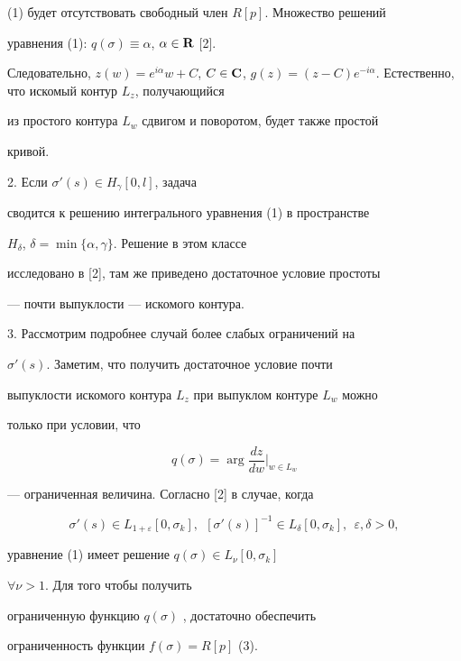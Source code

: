 (1) будет отсутствовать свободный член $R[p]$. Множество решений


уравнения (1): $q(\sigma) \equiv \alpha$, $\alpha \in {\bold R}$ [2].


Следовательно, $z(w) = e^{i\alpha} w + C$, $C \in {\bold C}$, $g(z) = (z -


C) e^{- i\alpha}$. Естественно, что искомый контур $L_z$, получающийся


из простого контура $L_w$ сдвигом и поворотом, будет также простой


кривой.





2. Если $\sigma'(s) \in H_{\gamma} [0,l]$, задача


сводится к решению интегрального уравнения (1) в пространстве


$H_{\delta}$, $\delta = \min \{\alpha, \gamma\}$. Решение в этом классе


исследовано в [2], там же приведено достаточное условие простоты


--- почти выпуклости --- искомого контура.





3. Рассмотрим подробнее случай более слабых ограничений на


$\sigma'(s)$. Заметим, что получить достаточное условие почти


выпуклости искомого контура $L_z$ при выпуклом контуре $L_w$ можно


только при условии, что


$$


q(\sigma) = \arg \frac{dz}{dw}\Big|_{w \in L_w} 


$$


--- ограниченная величина. Согласно [2] в случае, когда


$$


\sigma'(s) \in


L_{1 + \varepsilon}[0,\sigma_k],\ \ [\sigma'(s)]^{-1} \in


L_{\delta}[0,\sigma_k],\ \ \varepsilon, \delta > 0,


$$


уравнение (1) имеет решение $q(\sigma) \in L_{\nu}[0,\sigma_k]$


$\forall \nu > 1$. Для того чтобы получить


ограниченную функцию $q(\sigma)$ , достаточно обеспечить


ограниченность функции $f(\sigma) = R[p]$ (3). 






